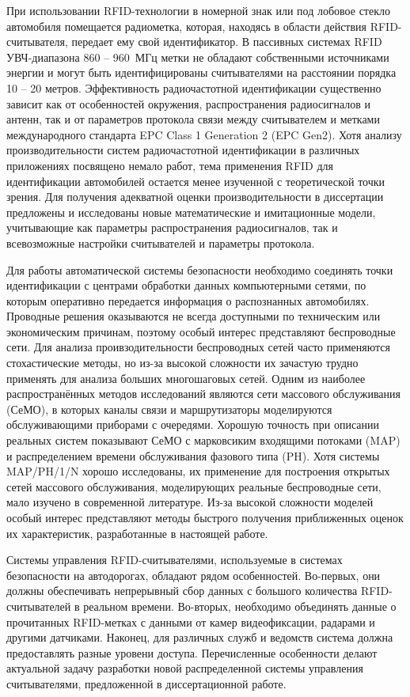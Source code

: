 При использовании RFID-технологии в номерной знак или под лобовое стекло автомобиля помещается радиометка, которая, находясь в области действия RFID-считывателя, передает ему свой идентификатор. В пассивных системах RFID УВЧ-диапазона 860 -- 960~МГц метки не обладают собственными источниками энергии и могут быть идентифицированы считывателями на расстоянии порядка 10 -- 20 метров. Эффективность радиочастотной идентификации существенно зависит как от особенностей окружения, распространения радиосигналов и антенн, так и от параметров протокола связи между считывателем и метками международного стандарта EPC Class 1 Generation 2 (EPC Gen2). Хотя анализу производительности систем радиочастотной идентификации в различных приложениях посвящено немало работ, тема применения RFID для идентификации автомобилей остается менее изученной с теоретической точки зрения. Для получения адекватной оценки производительности в диссертации предложены и исследованы новые математические и имитационные модели, учитывающие как параметры распространения радиосигналов, так и всевозможные настройки считывателей и параметры протокола.

Для работы автоматической системы безопасности необходимо соединять точки идентификации с центрами обработки данных компьютерными сетями, по которым оперативно передается информация о распознанных автомобилях. Проводные решения оказываются не всегда доступными по техническим или экономическим причинам, поэтому особый интерес представляют беспроводные сети. Для анализа проивзодительности беспроводных сетей часто применяются стохастические методы, но из-за высокой сложности их зачастую трудно применять для анализа больших многошаговых сетей. Одним из наиболее распространённых методов исследований являются сети массового обслуживания (СеМО), в которых каналы связи и маршрутизаторы моделируются обслуживающими приборами с очередями. Хорошую точность при описании реальных систем показывают СеМО с марковсиким входящими потоками (MAP) и распределением времени обслуживания фазового типа (PH). Хотя системы MAP/PH/1/N хорошо исследованы, их применение для построения открытых сетей массового обслуживания, моделирующих реальные беспроводные сети, мало изучено в современной литературе. Из-за высокой сложности моделей особый интерес представляют методы быстрого получения приближенных оценок их характеристик, разработанные в настоящей работе.

Системы управления RFID-считывателями, используемые в системах безопасности на автодорогах, обладают рядом особенностей. Во-первых, они должны обеспечивать непрерывный сбор данных с большого количества RFID-считывателей в реальном времени. Во-вторых, необходимо объединять данные о прочитанных RFID-метках с данными от камер видеофиксации, радарами и другими датчиками. Наконец, для различных служб и ведомств система должна предоставлять разные уровени доступа. Перечисленные особенности делают актуальной задачу разработки новой распределенной системы управления считывателями, предложенной в диссертационной работе.

